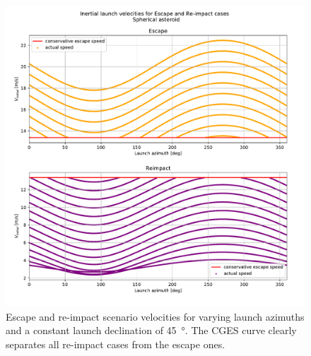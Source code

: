\begin{figure}[htb]
\centering
\captionsetup{justification=centering}
\includegraphics[width=\textwidth, height=0.5\textheight, keepaspectratio=true]{non_conservative_escape_speed/spherical_asteroid_escape_and_capture.pdf}
\caption{Escape and re-impact scenario velocities for varying launch azimuths and a constant launch declination of \protect\SI{45}{\degree}. The \gls{CGES} curve clearly separates all re-impact cases from the escape ones.}
\label{fig:conservative_spherical_asteroid_escape_and_reimpact}
\end{figure}
\FloatBarrier
